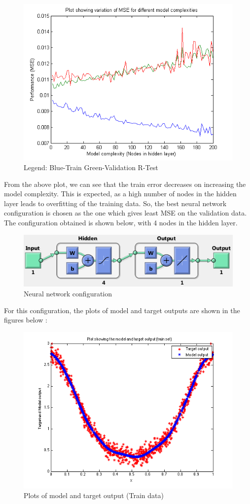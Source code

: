 \documentclass{article}
\begin{document}
\begin{figure}[H]
\centering
\includegraphics[width=\linewidth]{Regression/univariate/mse.png}
\caption{Legend: Blue-Train  Green-Validation R-Test}
\end{figure}

From the above plot, we can see that the train error decreases on increasing the model complexity. This is expected, as a high number of nodes in the hidden layer leads to overfitting of the training data. So, the best neural network configuration is chosen as the one which gives least MSE on the validation data.
The configuration obtained is shown below, with 4 nodes in the hidden layer.


\begin{figure}[H]
\centering
\includegraphics[width=0.6\linewidth]{Regression/univariate/net_config.png}
\caption{Neural network configuration}
\end{figure}

For this configuration, the plots of model and target outputs are shown in the figures below : 

\begin{figure}[H]
\centering
\includegraphics[width=0.5\linewidth]{Regression/univariate/trainOutput.png}
\caption{Plots of model and target output (Train data)}
\end{figure}
\end{document}
